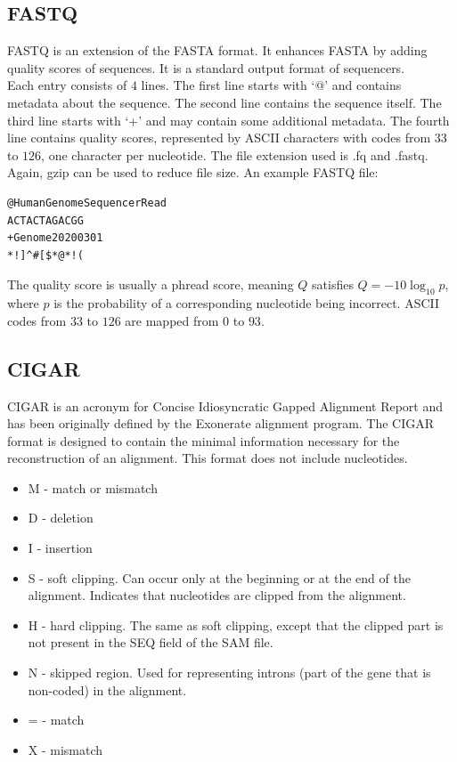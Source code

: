 \subsection{FASTQ}

FASTQ is an extension of the FASTA format. It enhances FASTA by adding quality scores of sequences. It is a standard output format of sequencers. \\

\noindent Each entry consists of $4$ lines. The first line starts with ‘@’ and contains metadata about the sequence. The second line contains the sequence itself. The third line starts with ‘+’ and may contain some additional metadata. The fourth line contains quality scores, represented by ASCII characters with codes from $33$ to $126$, one character per nucleotide. The file extension used is .fq and .fastq. Again, gzip can be used to reduce file size. An example FASTQ file:

\begin{verbatim}
@HumanGenomeSequencerRead
ACTACTAGACGG
+Genome20200301
*!]^#[$*@*!(
\end{verbatim}

\noindent The quality score is usually a phread score, meaning $Q$ satisfies $Q = -10 \log_{10} p$, where $p$ is the probability of a corresponding nucleotide being incorrect. ASCII codes from $33$ to $126$ are mapped from $0$ to $93$.

\subsection{CIGAR}

CIGAR is an acronym for Concise Idiosyncratic Gapped Alignment Report and has been originally defined by the Exonerate alignment program. The CIGAR format is designed to contain the minimal information necessary for the reconstruction of an alignment. This format does not include nucleotides.
\cite{cigar_nbis_explained}

\begin{itemize}
\item M - match or mismatch
\item D - deletion
\item I - insertion
\item S - soft clipping. Can occur only at the beginning or at the end of the alignment. Indicates that nucleotides are clipped from the alignment.
\item H - hard clipping. The same as soft clipping, except that the clipped part is not present in the SEQ field of the SAM file.
\item N - skipped region. Used for representing introns (part of the gene that is non-coded) in the alignment.
\item = - match
\item X - mismatch
\end{itemize}

